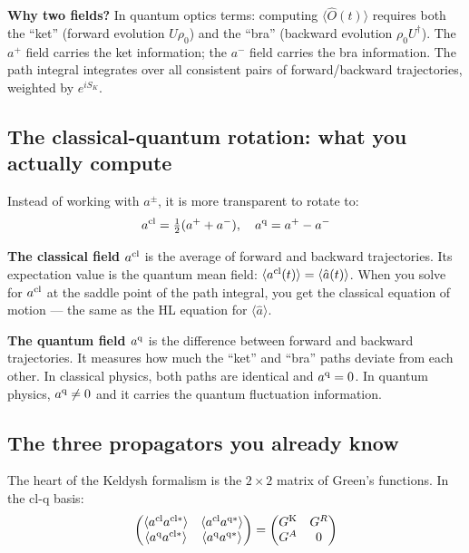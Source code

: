 \documentclass[12pt]{article}
\newcommand{\cl}{{\rm cl}}
\newcommand{\q}{{\rm q}}
\newcommand{\Keldysh}{{\rm K}}
\begin{document}
\begin{remark}
\textbf{Why two fields?}  In quantum optics terms: computing
$\langle\hat{O}(t)\rangle$ requires both the ``ket'' (forward evolution
$U\rho_0$) and the ``bra'' (backward evolution $\rho_0 U^\dagger$).
The $a^+$ field carries the ket information; the $a^-$ field carries
the bra information.  The path integral integrates over all consistent
pairs of forward/backward trajectories, weighted by $e^{iS_K}$.
\end{remark}

\subsection{The classical-quantum rotation: what you actually compute}

Instead of working with $a^\pm$, it is more transparent to rotate to:
\begin{equation}
  a^\cl = \tfrac{1}{2}(a^+ + a^-),\quad
  a^\q = a^+ - a^-
  \label{eq:clq_recall}
\end{equation}

\textbf{The classical field $a^\cl$} is the average of forward and backward
trajectories.  Its expectation value is the quantum mean field:
$\langle a^\cl(t)\rangle = \langle\hat{a}(t)\rangle$.
When you solve for $a^\cl$ at the saddle point of the path integral, you
get the classical equation of motion --- the same as the HL equation for
$\langle\hat{a}\rangle$.

\textbf{The quantum field $a^\q$} is the difference between forward and
backward trajectories.  It measures how much the ``ket'' and ``bra''
paths deviate from each other.  In classical physics, both paths are
identical and $a^\q = 0$.  In quantum physics, $a^\q\neq 0$ and it
carries the quantum fluctuation information.

\subsection{The three propagators you already know}

The heart of the Keldysh formalism is the $2\times 2$ matrix of Green's
functions.  In the cl-q basis:
\begin{equation}
  \begin{pmatrix}
  \langle a^\cl a^{\cl*}\rangle & \langle a^\cl a^{\q*}\rangle\\
  \langle a^\q a^{\cl*}\rangle & \langle a^\q a^{\q*}\rangle
  \end{pmatrix}
  =
  \begin{pmatrix}
  G^\Keldysh & G^R\\
  G^A & 0
  \end{pmatrix}
  \label{eq:Keldysh_matrix}
\end{equation}
\end{document}
